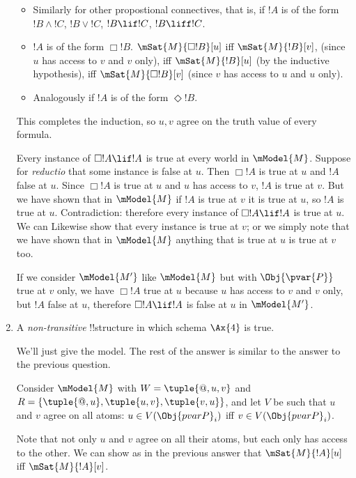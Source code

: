 \documentclass[../../../../include/open-logic-section]{subfiles}
\begin{document}
\begin{prob}
\begin{ans}
\begin{enumerate}
\begin{itemize}
			\item Similarly for other propostional connectives, that is,
			if $!A$ is of the form $!B\land!C$, $!B\lor!C$, $!B\lif!C$, 
			$!B\liff!C$. 

			\item $!A$ is of the form $\Box !B$. $\mSat{M}{\Box!B}[u]$
			iff $\mSat{M}{!B}[v]$, (since $u$ has access to $v$ and $v$
			only), iff $\mSat{M}{!B}[u]$ (by the inductive hypothesis),
			iff $\mSat{M}{\Box!B}[v]$ (since $v$ has access to $u$ and
			$u$ only). 

			\item Analogously if $!A$ is of the form $\Diamond !B$.
		\end{itemize}

		This completes the induction, so $u,v$ agree on the truth 
		value of every formula.

		Every instance of $\Box!A\lif !A$ is true at every world in 
		$\mModel{M}$. Suppose for \emph{reductio} that some instance
		is false at $u$. Then $\Box!A$ is true at $u$ and $!A$ false
		at $u$. Since  $\Box!A$ is true at $u$ and $u$ has 
		access to $v$, $!A$ is true at $v$. But we have shown that 
		in $\mModel{M}$ if $!A$ is true at $v$ it is true at $u$, 
		so $!A$ is true at $u$. Contradiction: therefore every 
		instance of $\Box!A\lif !A$ is true at $u$. We can Likewise
		show that every instance is true at $v$; or we simply note 
		that we have shown that in $\mModel{M}$ anything that is true 
		at $u$ is true at $v$ too. 

		If we consider $\mModel{M'}$ like $\mModel{M}$ but with 
		$\Obj{\pvar{P}}$ true at $v$ only, we have $\Box!A$ true at 
		$u$ because $u$ has access to $v$ and $v$ only, but $!A$ 
		false at $u$, therefore $\Box!A\lif !A$ is false at $u$ in
		$\mModel{M'}$.
		
		\item A \emph{non-transitive} !!{structure} in 
		which schema $\Ax{4}$ is true. 

		We'll just give the model. The rest of the answer is similar
		to the answer to the previous question.

		Consider $\mModel{M}$ with $W=\tuple{@,u,v}$ and 
		$R=\{\tuple{@,u},\tuple{u,v},\tuple{v,u}\}$, and let $V$ be such that 
		$u$ and $v$ agree on all atoms: $u\in V(\Obj{pvar{P}}_i)$ 
		iff $v\in V(\Obj{pvar{P}}_i)$. 
		
		Note that not only $u$ and $v$
		agree on all their atoms, but each only has access to the other.
		We can show as in the previous answer that $\mSat{M}{!A}[u]$
		iff $\mSat{M}{!A}[v]$. 


\end{enumerate}
\end{ans}
\end{prob}
\end{document}
